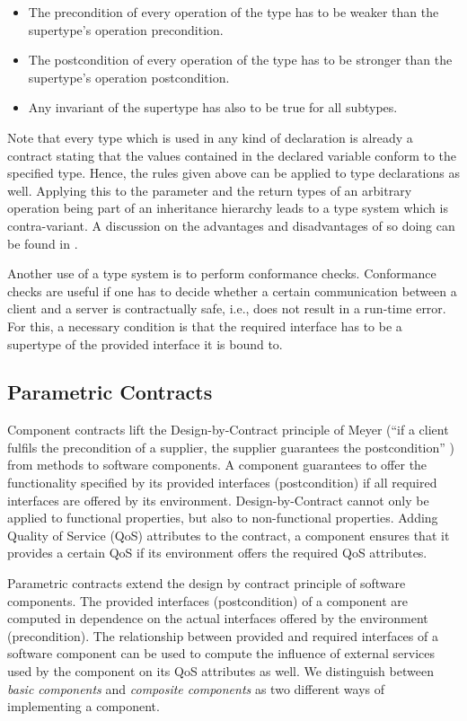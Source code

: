 \begin{itemize}
\item The precondition of every operation of the type has to be weaker than the supertype's operation precondition.
\item The postcondition of every operation of the type has to be stronger than the supertype's operation postcondition.
\item Any invariant of the supertype has also to be true for all subtypes.
\end{itemize}

Note that every type which is used in any kind of declaration is already a contract stating that the values contained in the declared variable conform to the specified type. Hence, the rules given above can be applied to type declarations as well. Applying this to the parameter and the return types of an arbitrary operation being part of an inheritance hierarchy leads to a type system which is contra-variant. A discussion on the advantages and disadvantages of so doing can be found in \cite[p. 628ff]{meyer1997a}.

Another use of a type system is to perform conformance checks. Conformance checks are useful if one has to decide whether a certain communication between a client and a server is contractually safe, i.e., does not result in a run-time error. For this, a necessary condition is that the required interface has to be a supertype of the provided interface it is bound to. 

\subsection{Parametric Contracts}

Component contracts lift the Design-by-Contract principle of Meyer (``if a
client fulfils the precondition of a supplier, the supplier guarantees the
postcondition'' \cite{meyer1992a}) from methods to software components. A
component guarantees to offer the functionality specified by its provided
interfaces (postcondition) if all required interfaces are offered by its
environment. Design-by-Contract cannot only be applied to
functional properties, but also to non-functional properties. Adding Quality of
Service (QoS) attributes to the contract, a component ensures that it
provides a certain QoS if its environment offers the required QoS attributes. 

Parametric contracts \cite{reussner2002c} extend the design by contract
principle of software components. The provided interfaces (postcondition) of a
component are computed in dependence on the actual interfaces offered by the
environment (precondition). The relationship between provided and required
interfaces of a software component can be used to compute the influence of
external services used by the component on its QoS attributes as well. We
distinguish between \emph{basic components} and \emph{composite components} as
two different ways of implementing a component.

